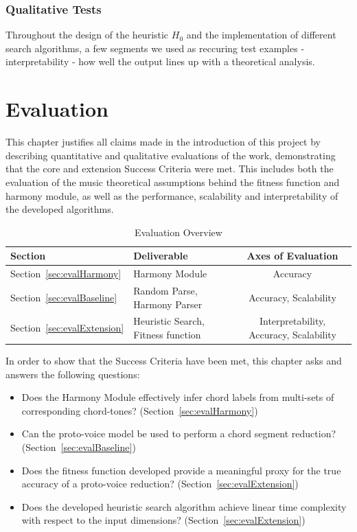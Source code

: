 \documentclass[12pt,a4paper,twoside,openany]{report} \usepackage[pdfborder={0 0 0}]{hyperref}    %
\theoremstyle{definition} \newtheorem{definition}{Definition}[section]
\begin{document}
  \subsection{Qualitative Tests} Throughout the design of the heuristic $H_0$ and the implementation of different search
  algorithms, a few segments we used as reccuring test examples - interpretability - how well the output lines up with
  a theoretical analysis.

\chapter{Evaluation} 
\label{chap:evaluation}

This chapter justifies all claims made in the introduction of this project by describing quantitative and qualitative
evaluations of the work, demonstrating that the core and extension Success Criteria were met. This includes both the
evaluation of the music theoretical assumptions behind the fitness function and harmony module, as well as the
performance, scalability and interpretability of the developed algorithms.

  \begin{table}[ht!] 
  \caption{Evaluation Overview} 
  \label{tab:evaluationOverview} 
  \centering
  {\small
  \begin{tabularx}{0.8\textwidth}{lXc} 
    Section & Deliverable & Axes of Evaluation  \\
    \toprule 
    Section~\ref{sec:evalHarmony} & Harmony Module & Accuracy \\
    Section~\ref{sec:evalBaseline} & Random Parse, Harmony Parser & Accuracy, Scalability \\
    Section~\ref{sec:evalExtension}& Heuristic Search, Fitness function & Interpretability, Accuracy, Scalability \\
    \end{tabularx} 
  }
  \end{table}


In order to show that the Success Criteria have been met, this chapter asks and answers the following questions: 
\begin{itemize} 
  \item Does the Harmony Module effectively infer chord labels from multi-sets of corresponding chord-tones? (Section~\ref{sec:evalHarmony})
  \item Can the proto-voice model be used to perform a chord segment reduction? (Section~\ref{sec:evalBaseline})
  \item Does the fitness function developed provide a meaningful proxy for the true accuracy of a proto-voice reduction?
    (Section~\ref{sec:evalExtension})
  \item Does the developed heuristic search algorithm achieve linear time complexity with respect to the input
    dimensions? (Section~\ref{sec:evalExtension})
\end{itemize}
\end{document}
